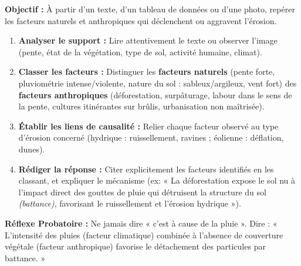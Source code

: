 \documentclass[11pt]{article}
\begin{document}
\begin{methode}
    \textbf{Objectif :} À partir d'un texte, d'un tableau de données ou d'une photo, repérer les facteurs naturels et anthropiques qui déclenchent ou aggravent l'érosion.
    \begin{enumerate}
        \item \textbf{Analyser le support :} Lire attentivement le texte ou observer l'image (pente, état de la végétation, type de sol, activité humaine, climat).
        \item \textbf{Classer les facteurs :} Distinguer les \textbf{facteurs naturels} (pente forte, pluviométrie intense/violente, nature du sol : sableux/argileux, vent fort) des \textbf{facteurs anthropiques} (déforestation, surpâturage, labour dans le sens de la pente, cultures itinérantes sur brûlis, urbanisation non maîtrisée).
        \item \textbf{Établir les liens de causalité :} Relier chaque facteur observé au type d'érosion concerné (hydrique : ruissellement, ravines ; éolienne : déflation, dunes).
        \item \textbf{Rédiger la réponse :} Citer explicitement les facteurs identifiés en les classant, et expliquer le mécanisme (ex: « La déforestation expose le sol nu à l'impact direct des gouttes de pluie qui détruisent la structure du sol \emph{(battance)}, favorisant le ruissellement et l'érosion hydrique »).
    \end{enumerate}
    \textbf{Réflexe Probatoire :} Ne jamais dire « c'est à cause de la pluie ». Dire : « L'intensité des pluies (facteur climatique) combinée à l'absence de couverture végétale (facteur anthropique) favorise le détachement des particules par battance. »
\end{methode}
\end{document}
